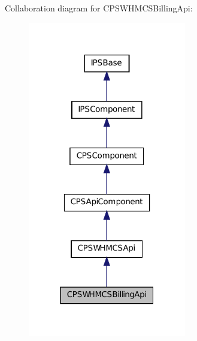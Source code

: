 Collaboration diagram for CPSWHMCSBillingApi:\nopagebreak
\begin{figure}[H]
\begin{center}
\leavevmode
\includegraphics[width=196pt]{classCPSWHMCSBillingApi__coll__graph}
\end{center}
\end{figure}
